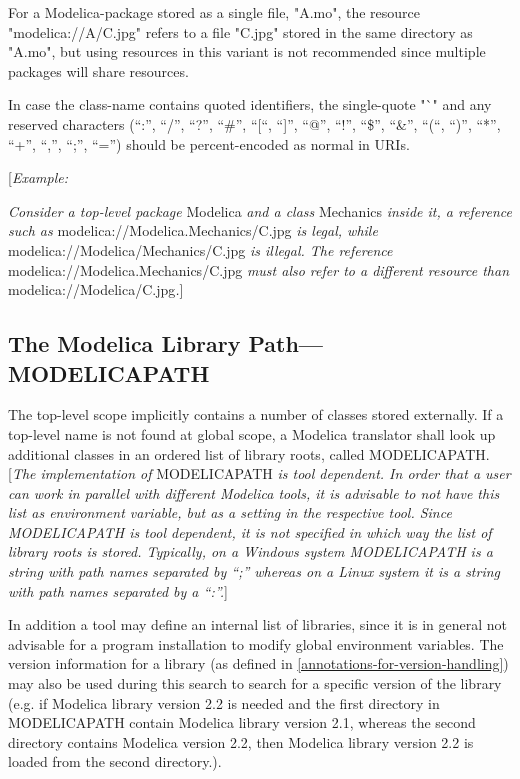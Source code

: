 \documentclass[10pt,a4paper]{report}
\def\doublelabel#1{\label{#1}}
\begin{document}
For a Modelica-package stored as a single file, "A.mo", the resource
"modelica://A/C.jpg" refers to a file "C.jpg" stored in the same
directory as "A.mo", but using resources in this variant is not
recommended since multiple packages will share resources.

In case the class-name contains quoted identifiers, the single-quote "`"
and any reserved characters (``:'', ``/'', ``?'', ``\#'', ``{[}``,
``{]}'', ``@'', ``!'', ``\$'', ``\&'', ``(``, ``)'', ``*'', ``+'',
``,'', ``;'', ``='') should be percent-encoded as normal in URIs.

{[}\emph{Example:}

\emph{Consider a top-level package} Modelica \emph{and a class}
Mechanics \emph{inside it, a reference such as}
modelica://Modelica.Mechanics/C.jpg \emph{is legal, while}
modelica://Modelica/Mechanics/C.jpg \emph{is illegal. The reference}
modelica://Modelica.Mechanics/C.jpg \emph{must also refer to a different
resource than} modelica://Modelica/C.jpg\emph{.}{]}

\subsection{The Modelica Library Path---MODELICAPATH}\doublelabel{the-modelica-library-path-modelicapath}

The top-level scope implicitly contains a number of classes stored
externally. If a top-level name is not found at global scope, a Modelica
translator shall look up additional classes in an ordered list of
library roots, called MODELICAPATH. {[}\emph{The implementation of}
MODELICAPATH \emph{is tool dependent. In order that a user can work in
parallel with different Modelica tools, it is advisable to not have this
list as environment variable, but as a setting in the respective tool.
Since MODELICAPATH is tool dependent, it is not specified in which way
the list of library roots is stored. Typically, on a Windows system
MODELICAPATH is a string with path names separated by ``;'' whereas on a
Linux system it is a string with path names separated by a ``:''.}{]}

In addition a tool may define an internal list of libraries, since it is
in general not advisable for a program installation to modify global
environment variables. The version information for a library (as defined
in \ref{annotations-for-version-handling}) may also be used during this search to search for a
specific version of the library (e.g. if Modelica library version 2.2 is
needed and the first directory in MODELICAPATH contain Modelica library
version 2.1, whereas the second directory contains Modelica version 2.2,
then Modelica library version 2.2 is loaded from the second directory.).
\end{document}
